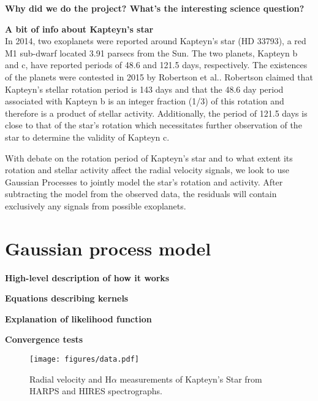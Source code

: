 \documentclass{aastex6}
\begin{document}
\textbf{Why did we do the project? What's the interesting science
question?}

\textbf{A bit of info about Kapteyn's star}\\

In 2014, two exoplanets were reported around Kapteyn's star (HD 33793), a red M1 sub-dwarf located 3.91 parsecs from the Sun.
The two planets, Kapteyn b and c, have reported periods of 48.6 and 121.5 days, respectively. The existences of the planets were contested in 2015 by Robertson et al..
Robertson claimed that Kapteyn's stellar rotation period is 143 days and that the 48.6 day period associated with Kapteyn b is an integer fraction (1/3) of this rotation and therefore is a product of stellar activity.
Additionally, the period of 121.5 days is close to that of the star's rotation which necessitates further observation of the star to determine the validity of Kapteyn c. \par
With debate on the rotation period of Kapteyn's star and to what extent its rotation and stellar activity affect the radial velocity signals, we look to use Gaussian Processes to jointly model the star's rotation and activity. After subtracting the model from the observed data, the residuals will contain exclusively any signals from possible exoplanets.

\section{Gaussian process model}\label{sec:GP}

\textbf{High-level description of how it works}

\textbf{Equations describing kernels}

\textbf{Explanation of likelihood function}

\textbf{Convergence tests}

\begin{figure} \label{fig:data}
    \begin{center}
    \texttt{[image: figures/data.pdf]}
    \caption{Radial velocity and H$\alpha$ measurements of Kapteyn's Star from HARPS and HIRES spectrographs. }
     \end{center}
\end{figure}
\end{document}
